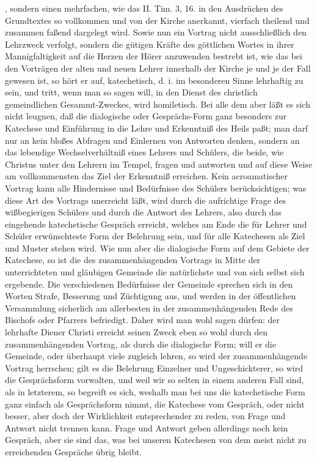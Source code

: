 , sondern einen mehrfachen, wie das II. Tim. 3, 16. in den Ausdrücken des Grundtextes so vollkommen und von der Kirche anerkannt, vierfach theilend und zusammen faßend dargelegt wird. Sowie nun ein Vortrag nicht ausschließlich den Lehrzweck verfolgt, sondern die gütigen Kräfte des göttlichen Wortes in ihrer Mannigfaltigkeit auf die Herzen der Hörer anzuwenden bestrebt ist, wie das bei den Vorträgen der alten und neuen Lehrer innerhalb der Kirche je und je der Fall gewesen ist, so hört er auf, katechetisch, d. i. im besonderen Sinne lehrhaftig zu sein, und tritt, wenn man so sagen will, in den Dienst des christlich gemeindlichen Gesammt-Zweckes, wird homiletisch. Bei alle dem aber läßt es sich nicht leugnen, daß die dialogische oder Gesprächs-Form ganz besonders zur Katechese und Einführung in die Lehre und Erkenntniß des Heils paßt; man darf nur an kein bloßes Abfragen und Einlernen von Antworten denken, sondern an das lebendige Wechselverhältniß eines Lehrers und Schülers, die beide, wie Christus unter den Lehrern im Tempel, fragen und antworten und auf diese Weise am vollkommensten das Ziel der Erkenntniß erreichen. Kein acroamatischer Vortrag kann alle Hindernisse und Bedürfnisse des Schülers berücksichtigen; was diese Art des Vortrags unerreicht läßt, wird durch die aufrichtige Frage des wißbegierigen Schülers und durch die Antwort des Lehrers, also durch das eingehende katechetische Gespräch erreicht, welches am Ende die für Lehrer und Schüler erwünschteste Form der Belehrung sein, und für alle Katechesen als Ziel und Muster stehen wird. Wie nun aber die dialogische Form
auf dem Gebiete der Katechese, so ist die des zusammenhängenden Vortrags in Mitte der unterrichteten und gläubigen Gemeinde die natürlichste und von sich selbst sich ergebende. Die verschiedenen Bedürfnisse der Gemeinde sprechen sich in den Worten Strafe, Besserung und Züchtigung aus, und werden in der öffentlichen Versammlung sicherlich am allerbesten in der zusammenhängenden Rede des Bischofs oder Pfarrers befriedigt. Daher wird man wohl sagen dürfen: der lehrhafte Diener Christi erreicht seinen Zweck eben so wohl durch den zusammenhängenden Vortrag, als durch die dialogische Form; will er die Gemeinde, oder überhaupt viele zugleich lehren, so wird der zusammenhängende Vortrag herrschen; gilt es die Belehrung Einzelner und Ungeschickterer, so wird die Gesprächsform vorwalten, und weil wir so selten in einem anderen Fall sind, als in letzterem, so begreift es sich, weshalb man bei uns die katechetische Form ganz einfach als Gesprächsform nimmt, die Katechese vom Gespräch, oder nicht besser, aber doch der Wirklichkeit entsprechender zu reden, von Frage und Antwort nicht trennen kann. Frage und Antwort geben allerdings noch kein Gespräch, aber sie sind das, was bei unseren Katechesen von dem meist nicht zu erreichenden Gespräche übrig bleibt.

